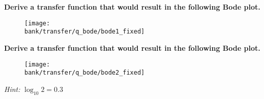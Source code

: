 

\begin{enumerate}

\qitem
  \textbf{Derive a transfer function that would result in the following Bode plot.}
  \begin{figure}[H]\centering
  \texttt{[image: \\bank/transfer/q\_bode/bode1\_fixed]}
  \end{figure}


\qitem
  \textbf{Derive a transfer function that would result in the following Bode plot.}
  \begin{figure}[H]\centering
  \texttt{[image: \\bank/transfer/q\_bode/bode2\_fixed]}
  \end{figure}
  \textit{Hint:} $\log_{10} 2 = 0.3$


%
%    
%
%
%  

\end{enumerate}
